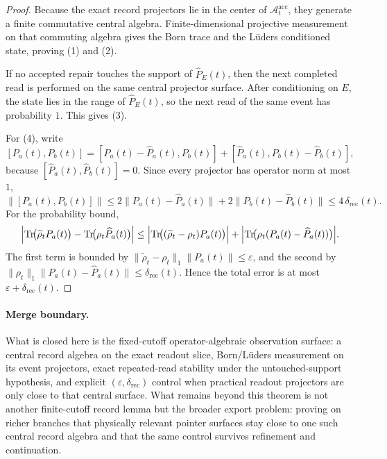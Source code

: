 \documentclass[11pt]{article}
\theoremstyle{remark}
\theoremstyle{plain}
\begin{document}
\begin{proof}
Because the exact record projectors lie in the center of \(\mathcal A_t^{\mathrm{acc}}\), they
generate a finite commutative central algebra. Finite-dimensional projective measurement on that
commuting algebra gives the Born trace and the L\"uders conditioned state, proving (1) and (2).

If no accepted repair touches the support of \(\widehat P_E(t)\), then the next completed read is
performed on the same central projector surface. After conditioning on \(E\), the state lies in
the range of \(\widehat P_E(t)\), so the next read of the same event has probability \(1\). This
gives (3).

For (4), write
\[
[P_a(t),P_b(t)]
=
[P_a(t)-\widehat P_a(t),P_b(t)]
+
[\widehat P_a(t),P_b(t)-\widehat P_b(t)],
\]
because \([\widehat P_a(t),\widehat P_b(t)]=0\). Since every projector has operator norm at most
\(1\),
\[
\|[P_a(t),P_b(t)]\|
\le
2\|P_a(t)-\widehat P_a(t)\|
+
2\|P_b(t)-\widehat P_b(t)\|
\le
4\,\delta_{\mathrm{rec}}(t).
\]
For the probability bound,
\[
\Bigl|
\operatorname{Tr}\!\bigl(\widetilde\rho_t P_a(t)\bigr)
-
\operatorname{Tr}\!\bigl(\rho_t \widehat P_a(t)\bigr)
\Bigr|
\le
\Bigl|\operatorname{Tr}\!\bigl((\widetilde\rho_t-\rho_t)P_a(t)\bigr)\Bigr|
+
\Bigl|\operatorname{Tr}\!\bigl(\rho_t(P_a(t)-\widehat P_a(t))\bigr)\Bigr|.
\]
The first term is bounded by \(\|\widetilde\rho_t-\rho_t\|_1\|P_a(t)\|\le \varepsilon\), and the
second by \(\|\rho_t\|_1\|P_a(t)-\widehat P_a(t)\|\le \delta_{\mathrm{rec}}(t)\). Hence the total
error is at most \(\varepsilon+\delta_{\mathrm{rec}}(t)\).
\end{proof}

\paragraph{Merge boundary.}
What is closed here is the fixed-cutoff operator-algebraic observation surface: a central record
algebra on the exact readout slice, Born/L\"uders measurement on its event projectors, exact
repeated-read stability under the untouched-support hypothesis, and explicit
\((\varepsilon,\delta_{\mathrm{rec}})\) control when practical readout projectors are only close
to that central surface. What remains beyond this theorem is not another finite-cutoff record
lemma but the broader export problem: proving on richer branches that physically relevant pointer
surfaces stay close to one such central record algebra and that the same control survives
refinement and continuation.
\end{document}
